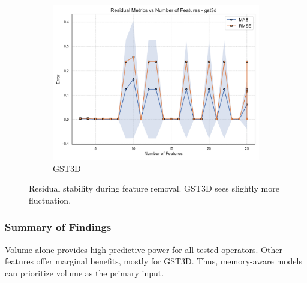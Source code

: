 \begin{figure}[htbp]
\begin{subfigure}[t]{0.32\textwidth}
        \includegraphics[width=\textwidth]{assets/images/05/residual_metrics_by_number_of_features_gst3d}
        \caption{\ac{GST3D}}
    \end{subfigure}
    \caption{Residual stability during feature removal. \ac{GST3D} sees slightly more fluctuation.}
    \label{fig:residual_metrics_by_number_of_features_operator_subplots}
\end{figure}

\subsubsection{Summary of Findings}
\label{subsec:feature-selection-summary}

Volume alone provides high predictive power for all tested operators.
Other features offer marginal benefits, mostly for \ac{GST3D}.
Thus, memory-aware models can prioritize volume as the primary input.
